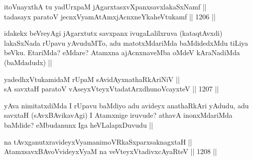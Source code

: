 \begin{shl}
itoV\s nayxthA tu yadUrxpaM jAgarxtasxvXpanxsavxlakaSxNamf || \\
tadasayx paratoV jecnxVyamAtAmxjAcnxneYkaheVtukamf ||  1206 ||  
\end{shl}

\begin{artha}
idakekx beVreyAgi jAgarxtutx savxpanx ivugaLalilxruva (kataqtAvxdi) lakaSxNada rUpavu yAvuduMTo, adu matotxMdariMda baMdidedxMdu  tiLiya beVku. EtariMda? eMdare? Atamxna ajAcnxnaveMba oMdeV kAraNadiMda (baMdadudx) ||
\end{artha}


\begin{shl}
yadedhxVtukamidaM rUpaM sA\s vidAyx\s nathaRkAriNiV || \\
sA savxtaH paratoV vA\s seyxVteyxVtadatArxdhunoVcayxteV ||  1207 ||  
\end{shl}

\begin{artha}
yAva nimitatxdiMda I rUpavu baMdiyo adu avideyx anathaRkAri yAdudu, adu savxtaH (sAvxBAvikavAgi) I Atamxnige iruvude? athavA inonxMdariMda baMdide? eMbudanunx Iga heVLalapxDuvudu ||
\end{artha}

\begin{shl}
na tAvxganutxravideyxVyamanimoVRkaSxparxsaknagxtaH || \\
AtamxsavxBAvoV\s videyxVyaM na veVteyxVtadivxcAyaRteV ||  1208 ||  
\end{shl}

